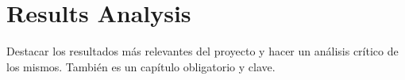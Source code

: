 \chapter{Results Analysis}
	Destacar los resultados más relevantes del proyecto y hacer un análisis crítico de los mismos. También es un capítulo obligatorio y clave.
